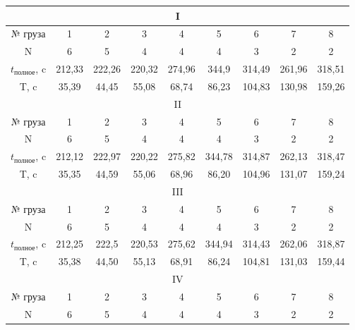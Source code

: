 \documentclass[12pt,a4paper]{article}
\begin{document}
\begin{table}[h]
	\begin{center}
		\begin{tabular}{|c|c|c|c|c|c|c|c|c|}
			\hline
			\multicolumn{9}{|c|}{I}                                                      \\ \hline
			№ груза & 1      & 2      & 3      & 4      & 5      & 6      & 7      & 8      \\ \hline
			N    & 6      & 5      & 4      & 4      & 4      & 3      & 2      & 2      \\ \hline
			$t_{\text{полное}}$, c    & 212,33 & 222,26 & 220,32 & 274,96 & 344,9  & 314,49 & 261,96 & 318,51 \\ \hline
			T, c & 35,39 & 44,45 & 55,08 & 68,74 & 86,23 & 104,83 & 130,98 & 159,26 \\ \hline
			\multicolumn{9}{|c|}{II}                                                     \\ \hline	
			№ груза & 1      & 2      & 3      & 4      & 5      & 6      & 7      & 8      \\ \hline
			N    & 6      & 5      & 4      & 4      & 4      & 3      & 2      & 2      \\ \hline
			$t_{\text{полное}}$, c     & 212,12 & 222,97 & 220,22 & 275,82 & 344,78 & 314,87 & 262,13 & 318,47 \\ \hline
			T, c & 35,35 & 44,59 & 55,06 & 68,96 & 86,20 & 104,96 & 131,07 & 159,24 \\ \hline
			\multicolumn{9}{|c|}{III}                                                    \\ \hline
			№ груза & 1      & 2      & 3      & 4      & 5      & 6      & 7      & 8      \\ \hline
			N    & 6      & 5      & 4      & 4      & 4      & 3      & 2      & 2      \\ \hline
			$t_{\text{полное}}$, c    & 212,25 & 222,5  & 220,53 & 275,62 & 344,94 & 314,43 & 262,06 & 318,87 \\ \hline
			T, c & 35,38 & 44,50 & 55,13 & 68,91 & 86,24 & 104,81 & 131,03 & 159,44 \\ \hline
			\multicolumn{9}{|c|}{IV}                                                     \\ \hline
			№ груза & 1      & 2      & 3      & 4      & 5      & 6      & 7      & 8      \\ \hline	
			N    & 6      & 5      & 4      & 4      & 4      & 3      & 2      & 2      \\ \hline

\end{tabular}
\end{center}
\end{table}
\end{document}
